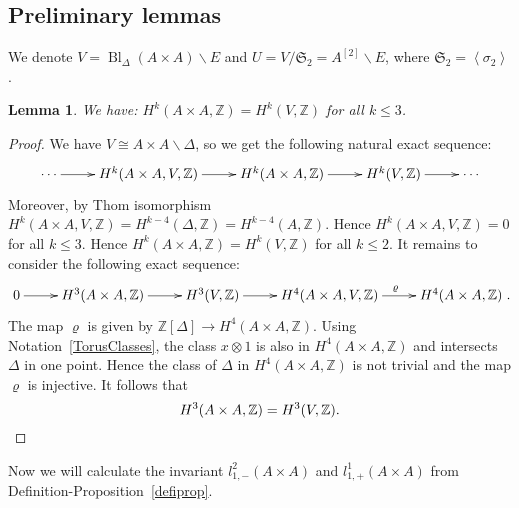\documentclass{alggeom}
\DeclareMathOperator{\Bl}{Bl}
\renewcommand{\rho}{\varrho}
\newcommand{\hilb}[1]{^{[#1]}}
\newcommand{\Z}{\mathbb{Z}}
\theoremstyle{plain}
\newtheorem{lemma}[theorem]{Lemma}
\theoremstyle{definition}
\theoremstyle{remark}
\begin{document}
\subsection{Preliminary lemmas}\label{Prelemma}
We denote $V=\Bl_\Delta(A\! \times\! A)\smallsetminus E$ and $U=V/\mathfrak S_{2}=A\hilb{2}\smallsetminus E$, where $\mathfrak{S}_{2}=\left\langle \sigma_{2}\right\rangle$. 
\begin{lemma}\label{1}
We have: $H^{k}(A\times A,\Z)=H^{k}(V,\Z)$
for all $k\leq 3$.
\end{lemma}
\begin{proof}
We have $V\cong A\times A\smallsetminus \Delta$,
so we get the following natural exact sequence:
$$\xymatrix{ \cdots\ar[r]&H^{k}(A\times A,V,\Z)\ar[r] & H^{k}(A\times A,\Z)\ar[r] & H^{k}(V,\Z)\ar[r]& \cdots}$$
Moreover, by Thom isomorphism $H^{k}(A\times A,V,\Z)=H^{k-4}(\Delta,\Z)=H^{k-4}(A,\Z)$.
Hence $H^{k}(A\times A,V,\Z)=0$ for all $k\leq 3$.
Hence $H^{k}(A\times A,\Z)=H^{k}(V,\Z)$
for all $k\leq 2$. It remains to consider the following exact sequence:
$$\xymatrix{ 0\ar[r]&H^{3}(A\times A,\Z)\ar[r]&H^{3}(V,\Z)\ar[r] & H^{4}(A\times A,V,\Z)\ar[r]^{\rho} & H^{4}(A\times A,\Z)}.$$
The map $\rho$ is given by $\Z \left[\Delta\right] \rightarrow H^{4}(A\times A,\Z)$.
Using Notation~\ref{TorusClasses}, the class $x\otimes 1$ is also in $H^{4}(A\times A,\Z)$ and intersects $\Delta$ in one point.
Hence the class of $\Delta$ in $H^{4}(A\times A,\Z)$ is not trivial and the map $\rho$ is injective.
It follows that 
\begin{equation*}
H^{3}(A\times A,\Z)=H^{3}(V,\Z).
\qedhere
\end{equation*}
\end{proof}
Now we will calculate the invariant $l_{1,-}^{2}(A\times A)$ and $l_{1,+}^{1}(A\times A)$ from Definition-Proposition~\ref{defiprop}.
\end{document}
